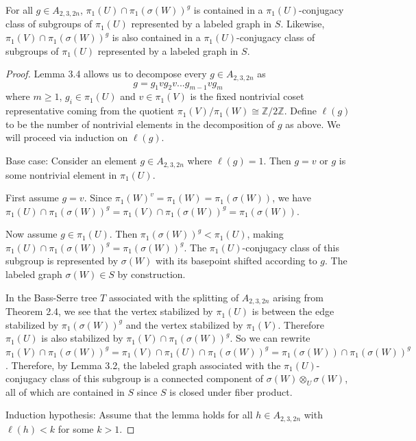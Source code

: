\documentclass[10pt,a4paper]{amsart}
\begin{document}
\begin{lemma}
    For all $g\in A_{2,3,2n}$, $\pi_1(U)\cap\pi_1(\sigma(W))^g$ is contained in a $\pi_1(U)$-conjugacy class of subgroups of $\pi_1(U)$ represented by a labeled graph in $S$. Likewise, $\pi_1(V)\cap\pi_1(\sigma(W))^g$ is also contained in a $\pi_1(U)$-conjugacy class of subgroups of $\pi_1(U)$ represented by a labeled graph in $S$.
\end{lemma}

\begin{proof}
    Lemma 3.4 allows us to decompose every $g\in A_{2,3,2n}$ as \[g=g_1vg_2v...g_{m-1}vg_m\]
    where $m\geq1$,  $g_i\in\pi_1(U)$ and $v\in\pi_1(V)$ is the fixed nontrivial coset representative coming from the quotient $\pi_1(V)/\pi_1(W)\cong\mathbb{Z}/2\mathbb{Z}$. Define $\ell(g)$ to be the number of nontrivial elements in the decomposition of $g$ as above. We will proceed via induction on $\ell(g)$.

    Base case: Consider an element $g\in A_{2,3,2n}$ where $\ell(g)=1$. Then $g=v$ or $g$ is some nontrivial element in $\pi_1(U)$.
    
    First assume $g=v$. Since $\pi_1(W)^v=\pi_1(W)=\pi_1(\sigma(W))$, we have $\pi_1(U)\cap\pi_1(\sigma(W))^g=\pi_1(V)\cap\pi_1(\sigma(W))^g=\pi_1(\sigma(W))$.

    Now assume $g\in\pi_1(U)$. Then $\pi_1(\sigma(W))^g<\pi_1(U)$, making $\pi_1(U)\cap\pi_1(\sigma(W))^g=\pi_1(\sigma(W))^g$. The $\pi_1(U)$-conjugacy class of this subgroup is represented by $\sigma(W)$ with its basepoint shifted according to $g$. The labeled graph $\sigma(W)\in S$ by construction.

    In the Bass-Serre tree $T$ associated with the splitting of $A_{2,3,2n}$ arising from Theorem 2.4, we see that the vertex stabilized by $\pi_1(U)$ is between the edge stabilized by $\pi_1(\sigma(W))^g$ and the vertex stabilized by $\pi_1(V)$. Therefore $\pi_1(U)$ is also stabilized by $\pi_1(V)\cap\pi_1(\sigma(W))^g$. So we can rewrite $\pi_1(V)\cap\pi_1(\sigma(W))^g=\pi_1(V)\cap\pi_1(U)\cap\pi_1(\sigma(W))^g=\pi_1(\sigma(W))\cap\pi_1(\sigma(W))^g$. Therefore, by Lemma 3.2, the labeled graph associated with the $\pi_1(U)$-conjugacy class of this subgroup is a connected component of $\sigma(W)\otimes_U\sigma(W)$, all of which are contained in $S$ since $S$ is closed under fiber product.

    Induction hypothesis: Assume that the lemma holds for all $h\in A_{2,3,2n}$ with $\ell(h)<k$ for some $k>1$.
    

\end{proof}
\end{document}
